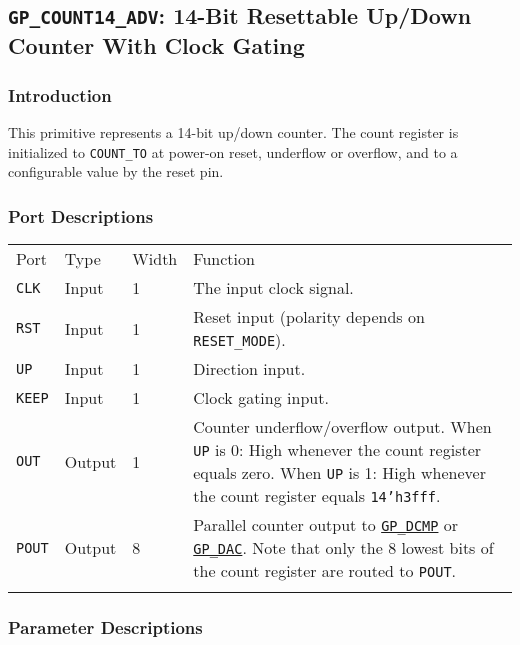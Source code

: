 \documentclass[11pt]{article}
\newcommand{\tokenstyle}[1]{\texttt{#1}}
\newcommand{\datastyle}[1]{\texttt{#1}}
\newcommand{\whenstyle}[1]{{\fontseries{sb}\selectfont#1}}
\newcommand{\tokenref}[2]{\hyperref[#2]{\tokenstyle{#1}}}
\newcommand{\thinhline}{\Xhline{1\arrayrulewidth}}
\newcommand{\thickhline}{\Xhline{2.5\arrayrulewidth}}
\begin{document}
\pagebreak
\subsection{\tokenstyle{GP\_COUNT14\_ADV}: 14-Bit Resettable Up/Down Counter With Clock Gating}
\label{gp-count14-adv}

\subsubsection{Introduction}
This primitive represents a 14-bit up/down counter. The count register is initialized to \tokenstyle{COUNT\_TO} at
power-on reset, underflow or overflow, and to a configurable value by the reset pin.

\subsubsection{Port Descriptions}

\begin{tabularx}{\textwidth}{lllX}
\thinhline
\whenstyle{Port} & \whenstyle{Type} & \whenstyle{Width} & \whenstyle{Function} \\
\thickhline
\tokenstyle{CLK} & Input & 1 & The input clock signal. \\
\thinhline
\tokenstyle{RST} & Input & 1 & Reset input (polarity depends on \tokenstyle{RESET\_MODE}). \\
\thinhline
\tokenstyle{UP} & Input & 1 & Direction input. \\
\thinhline
\tokenstyle{KEEP} & Input & 1 & Clock gating input. \\
\thinhline
\tokenstyle{OUT} & Output & 1 & Counter underflow/overflow output. \newline
	\whenstyle{When \tokenstyle{UP} is 0:} High whenever the count register equals zero. \newline
	\whenstyle{When \tokenstyle{UP} is 1:} High whenever the count register equals \datastyle{14'h3fff}. \\
\thinhline
\tokenstyle{POUT} & Output & 8 & Parallel counter output to \tokenref{GP\_DCMP}{gp-dcmp} or \tokenref{GP\_DAC}{gp-dac}.
Note that only the 8 lowest bits of the count register are routed to \tokenstyle{POUT}. \\
\thinhline
\end{tabularx}

\subsubsection{Parameter Descriptions}
\end{document}
